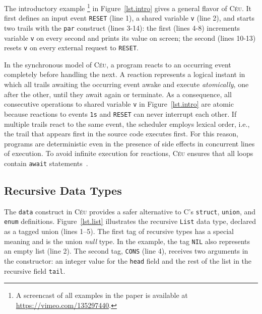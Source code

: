 \documentclass{sig-alternate}
\newcommand{\CEU}{\textsc{C\'{e}u}\xspace}
\newcommand{\code}[1] {{\small{\texttt{#1}}}}
\begin{document}

The introductory example%
\footnote{A screencast of all examples in the paper is available at 
\url{https://vimeo.com/135297440}.}
in Figure~\ref{lst.intro} gives a general flavor of \CEU.
It first defines an input event \code{RESET} (line 1), a shared variable 
\code{v} (line 2), and starts two trails with the \code{par} construct (lines 
3-14): the first (lines 4-8) increments variable \code{v} on every second and 
prints its value on screen; the second (lines 10-13) resets \code{v} on every 
external request to \code{RESET}.

In the synchronous model of \CEU, a program reacts to an occurring event 
completely before handling the next.
%
A reaction represents a logical instant in which all trails awaiting the 
occurring event awake and execute \emph{atomically}, one after the other, until 
they await again or terminate.
%
As a consequence, all consecutive operations to shared variable \code{v} in 
Figure~\ref{lst.intro} are atomic because reactions to events \code{1s} and 
\code{RESET} can never interrupt each other.
%
If multiple trails react to the same event, the scheduler employs lexical 
order, i.e., the trail that appears first in the source code executes first.
%
For this reason, programs are deterministic even in the presence of side 
effects in concurrent lines of execution.
%
To avoid infinite execution for reactions, \CEU ensures that all loops contain 
\code{await} statements~\cite{ceu.sensys13}.

\subsection{Recursive Data Types}

The \code{data} construct in \CEU provides a safer alternative to C's
\code{struct}, \code{union}, and \code{enum} definitions.
%
Figure~\ref{lst.list} illustrates the recursive \code{List} data type,
declared as a tagged union (lines 1--5).
The first tag of recursive types has a special meaning and is the union 
\emph{null} type.
In the example, the tag \code{NIL} also represents an empty list (line 2).
The second tag, \code{CONS} (line 4), receives two arguments in the 
constructor: an integer value for the \code{head} field and the rest of the 
list in the recursive field \code{tail}.
\end{document}

